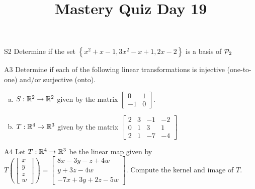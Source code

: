 \documentclass{sbgLAquiz}
\title{Mastery Quiz Day 19 }
\begin{document}
\begin{problem}{S2}
Determine if the set $\left\{ x^2+x-1, 3x^2-x+1, 2x-2 \right\}$ is a basis of $\P_2$
\end{problem}

\begin{problem}{A3}
Determine if each of the following linear transformations is injective (one-to-one) and/or surjective (onto).
\begin{enumerate}[(a)]
\item $S: \IR^2 \rightarrow \IR^2$ given by the matrix $\begin{bmatrix} 0 & 1 \\ -1 & 0 \end{bmatrix}$.
\item $T: \IR^4 \rightarrow \IR^3$ given by the matrix $\begin{bmatrix} 2 & 3 & -1 & -2 \\ 0 & 1 & 3 & 1 \\ 2 & 1 & -7 & -4 \end{bmatrix}$
\end{enumerate}
\end{problem}
\newpage

\begin{problem}{A4}
Let $T: \IR^4 \rightarrow \IR^3$ be the linear map given by $T\left(\begin{bmatrix} x \\ y \\ z \\ w \end{bmatrix} \right) = \begin{bmatrix}  8x-3y-z+4w \\ y+3z-4w \\ -7x+3y+2z-5w\end{bmatrix} $.  Compute the kernel and image of $T$.
\end{problem}
\end{document}
